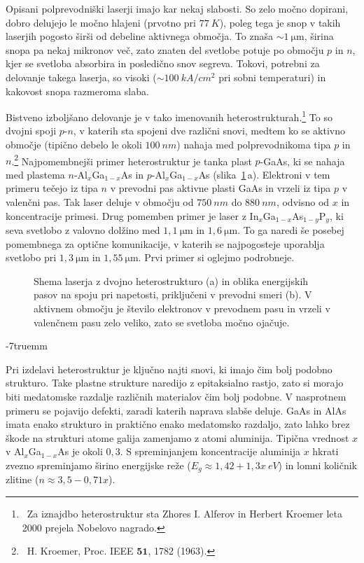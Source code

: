 Opisani polprevodniški laserji imajo kar nekaj slabosti. So zelo močno dopirani, 
dobro delujejo le močno hlajeni (prvotno pri $77~\si{K}$), poleg tega je snop 
v takih laserjih pogosto širši od debeline aktivnega območja. To znaša
$\sim 1~\si{\micro\meter}$, širina snopa pa nekaj mikronov več, zato
znaten del svetlobe potuje po območju $p$ in $n$, kjer se svetloba absorbira in posledično
snov segreva. Tokovi, potrebni za 
delovanje takega laserja, so visoki ($\sim 100~\si{kA}/\si{cm}^2$ pri sobni temperaturi) in
kakovost snopa razmeroma slaba. 

Bistveno izboljšano delovanje je v tako imenovanih 
heterostrukturah.\footnote{~Za 
iznajdbo heterostruktur sta Zhores I. Alferov in Herbert Kroemer leta 2000 prejela Nobelovo nagrado.}
 To so dvojni spoji $p$-$n$, 
v katerih sta spojeni dve različni snovi, medtem ko se aktivno območje (tipično debelo le okoli $100~\si{nm}$) 
nahaja med polprevodnikoma tipa $p$ in $n$.\footnote{~H. Kroemer, Proc. IEEE $\mathbf{51}$, 1782 (1963).}
Najpomembnejši primer heterostruktur je tanka plast $p$-GaAs, ki se nahaja med plastema  
$n$-Al$_x$Ga$_{1-x}$As in $p$-Al$_x$Ga$_{1-x}$As 
(slika~\ref{fig:hetero}\,a). Elektroni v tem primeru tečejo iz tipa $n$ v prevodni pas aktivne plasti
GaAs in vrzeli iz tipa $p$ v valenčni pas. 
Tak laser deluje v območju od $750~\si{nm}$ do $880~\si{nm}$, odvisno od $x$ in koncentracije primesi.
Drug pomemben primer je laser z In$_{x}$Ga$_{1-x}$As$_{1-y}$P$_y$, ki seva svetlobo z valovno 
dolžino med $1,1~\si{\micro\metre}$ in $1,6~\si{\micro\metre}$. To ga naredi še posebej pomembnega za optične
komunikacije, v katerih se najpogosteje uporablja svetlobo pri $1,3~\si{\micro\meter}$ in $1,55~\si{\micro\meter}$. 
Prvi primer si oglejmo podrobneje.
\begin{figure}[ht]
\centering
\def\svgwidth{145truemm} 

\caption{Shema laserja z dvojno heterostrukturo (a) in oblika energijskih pasov 
na spoju pri napetosti, priključeni v prevodni smeri (b). V aktivnem območju
je število elektronov v prevodnem pasu in vrzeli v valenčnem pasu zelo veliko, zato se 
svetloba močno ojačuje.
}
\label{fig:hetero}
\end{figure}
\vglue-7truemm
\begin{remark}
Pri izdelavi heterostruktur je ključno najti snovi, ki imajo čim bolj podobno strukturo.
Take plastne strukture naredijo z epitaksialno rastjo, zato si morajo biti medatomske
razdalje različnih materialov čim bolj podobne. V nasprotnem primeru se pojavijo 
defekti, zaradi katerih naprava slabše deluje. 
GaAs in AlAs imata enako strukturo in praktično enako medatomsko razdaljo, zato 
lahko brez škode na strukturi atome galija zamenjamo z atomi aluminija. Tipična
vrednost $x$ v Al$_x$Ga$_{1-x}$As je okoli $0,3$. S spreminjanjem koncentracije aluminija $x$ hkrati
zvezno spreminjamo širino energijske reže ($E_g \approx 1,42 + 1,3x~\si{eV}$) in lomni količnik 
zlitine ($n \approx 3,5-0,71x$).
\end{remark}

